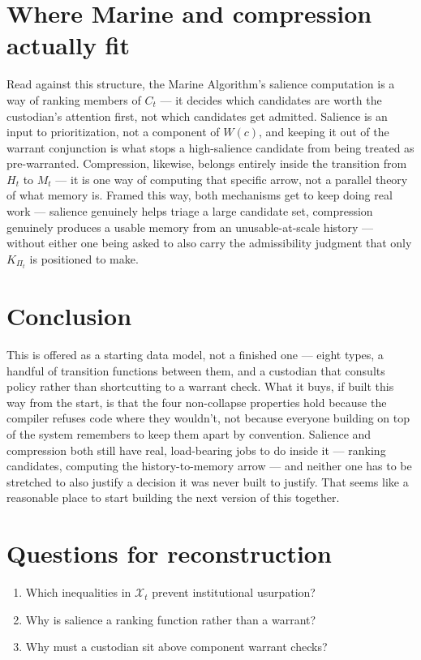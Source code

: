 \documentclass[11pt,openany]{book}
\begin{document}
\section{Where Marine and compression actually fit}

Read against this structure, the Marine Algorithm's salience computation is a way of ranking members of $C_t$ — it decides which candidates are worth the custodian's attention first, not which candidates get admitted. Salience is an input to prioritization, not a component of $W(c)$, and keeping it out of the warrant conjunction is what stops a high-salience candidate from being treated as pre-warranted. Compression, likewise, belongs entirely inside the transition from $H_t$ to $M_t$ — it is one way of computing that specific arrow, not a parallel theory of what memory is. Framed this way, both mechanisms get to keep doing real work — salience genuinely helps triage a large candidate set, compression genuinely produces a usable memory from an unusable-at-scale history — without either one being asked to also carry the admissibility judgment that only $K_{\Pi_t}$ is positioned to make.

\section{Conclusion}

This is offered as a starting data model, not a finished one — eight types, a handful of transition functions between them, and a custodian that consults policy rather than shortcutting to a warrant check. What it buys, if built this way from the start, is that the four non-collapse properties hold because the compiler refuses code where they wouldn't, not because everyone building on top of the system remembers to keep them apart by convention. Salience and compression both still have real, load-bearing jobs to do inside it — ranking candidates, computing the history-to-memory arrow — and neither one has to be stretched to also justify a decision it was never built to justify. That seems like a reasonable place to start building the next version of this together.

\section*{Questions for reconstruction}

\begin{enumerate}

\item Which inequalities in $\mathcal{X}_t$ prevent institutional usurpation?

\item Why is salience a ranking function rather than a warrant?

\item Why must a custodian sit above component warrant checks?

\end{enumerate}
\end{document}
